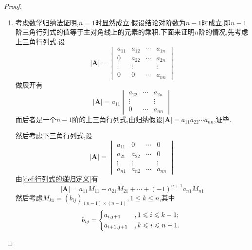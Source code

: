 {\begin{proof}
\begin{enumerate}[label = {\textup{(\arabic*)}}]
            \item 考虑数学归纳法证明,$n=1$时显然成立.假设结论对阶数为$n-1$时成立,即$n-1$阶三角行列式的值等于主对角线上的元素的乘积.下面来证明$n$阶的情况,先考虑上三角行列式.设\[
                      \left|\bm{A}\right|=\begin{vmatrix}
                          a_{11} & a_{12} & \cdots & a_{1n} \\
                          0      & a_{22} & \cdots & a_{2n} \\
                          \vdots & \vdots &        & \vdots \\
                          0      & 0      & \cdots & a_{nn}
                      \end{vmatrix}
                  \]做展开有\[
                      \left|\bm{A}\right|=a_{11}\begin{vmatrix}
                          a_{22} & \cdots & a_{2n} \\
                          \vdots &        & \vdots \\
                          0      & \cdots & a_{nn}
                      \end{vmatrix}
                  \]而后者是一个$n-1$阶的上三角行列式,由归纳假设$\left|\bm{A}\right|=a_{11}a_{22}\cdots a_{nn}$,证毕.

                  然后考虑下三角行列式,设\[
                      \left|\bm{A}\right|= \begin{vmatrix}
                          a_{11} & 0      & \cdots & 0      \\
                          a_{21} & a_{22} & \cdots & 0      \\
                          \vdots & \vdots &        & \vdots \\
                          a_{n1} & a_{n2} & \cdots & a_{nn}
                      \end{vmatrix}
                  \]由\cref{def:行列式的递归定义}有\[
                      \left|\bm{A}\right|=a_{11}M_{11}-a_{21}M_{21}+\cdots+(-1)^{n+1}a_{n1}M_{n1}
                  \]然后考虑$M_{k1}=\left(
                      b_{ij}
                      \right)_{\left(n-1\right)\times \left(n-1\right)},1\leqslant k\leqslant n$,其中\[
                      b_{ij}=
                      \begin{cases*}
                          a_{i,j+1}   & $,1\leqslant i\leqslant k-1;$   \\
                          a_{i+1,j+1} & $,k\leqslant i\leqslant   n-1.$
                      \end{cases*}
                  \]


\end{enumerate}
\end{proof}}
